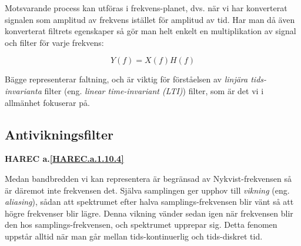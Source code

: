 Motsvarande process kan utföras i frekvens-planet, dvs. när vi har konverterat
signalen som amplitud av frekvens istället för amplitud av tid.
Har man då även konverterat filtrets egenskaper så gör man helt enkelt en
multiplikation av signal och filter för varje frekvens:

\[
Y(f) = X(f)H(f)
\]

Bägge representerar faltning, och är viktig för förståelsen av \emph{linjära
tids-invarianta} filter (eng. \emph{linear time-invariant (LTI)}) filter,
som är det vi i allmänhet fokuserar på.

\subsection{Antivikningsfilter}
\textbf{HAREC a.\ref{HAREC.a.1.10.4}\label{myHAREC.a.1.10.4}}

Medan bandbredden vi kan representera är begränsad av Nykvist-frekvensen så
är däremot inte frekvensen det.
Själva samplingen ger upphov till \emph{vikning} (eng. \emph{aliasing}),
sådan att spektrumet efter halva samplings-frekvensen blir vänt så att högre
frekvenser blir lägre.
Denna vikning vänder sedan igen när frekvensen blir den hos
samplings-frekvensen, och spektrumet upprepar sig.
Detta fenomen uppstår alltid när man går mellan tids-kontinuerlig och
tids-diskret tid.

